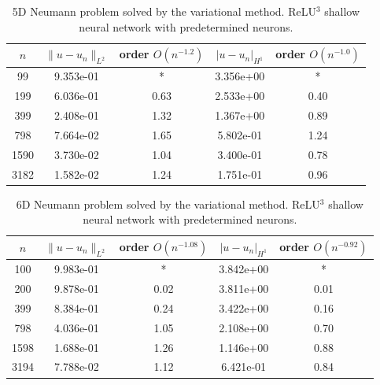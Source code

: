 \documentclass{article}
\theoremstyle{remark}
\begin{document}
      \begin{table}[H]
        \centering
        \begin{tabular}{c|c|c|c|c}
$n$ & 	 $\|u-u_n \|_{L^2}$ & 	 order $O(n^{-1.2})$ & $ |u-u_n |_{H^1}$ & 	 order $O(n^{-1.0})$\\ \hline \hline 
99 		 &  9.353e-01 &  		*  &  3.356e+00 &  *   \\ \hline  
199 		 &  6.036e-01 &  		 0.63  &  2.533e+00 &  0.40  \\ \hline  
399 		 &  2.408e-01 &  		 1.32  &  1.367e+00 &  0.89  \\ \hline  
798 		 &  7.664e-02 &  		 1.65  &  5.802e-01 &  1.24  \\ \hline  
1590 		 &  3.730e-02 &  		 1.04  &  3.400e-01 &  0.78  \\ \hline  
3182 		 &  1.582e-02 &  		 1.24  &  1.751e-01 &  0.96  \\ \hline 
        \end{tabular}
        \caption{5D Neumann problem solved by the variational method. ReLU$^3$ shallow neural network with predetermined neurons. }
        \label{tab:Neuman-RFM-ex1-5d}
    \end{table}
    
      \begin{table}[H]
        \centering
        \begin{tabular}{c|c|c|c|c}
$n$ & 	 $\|u-u_n \|_{L^2}$ & 	 order $O(n^{-1.08})$  & $ |u-u_n |_{H^1}$ & 	 order $O(n^{-0.92})$\\ \hline \hline 

100 		 &  9.983e-01 &  		 *  &  3.842e+00 &  *  \\ \hline  
200 		 &  9.878e-01 &  		 0.02  &  3.811e+00 &  0.01  \\ \hline  

399 		 &  8.384e-01 &  		 0.24  &  3.422e+00 &  0.16  \\ \hline  

798 		 &  4.036e-01 &  		 1.05  &  2.108e+00 &  0.70  \\ \hline  

1598 		 &  1.688e-01 &  		 1.26  &  1.146e+00 &  0.88  \\ \hline  

3194 		 &  7.788e-02 &  		 1.12  &  6.421e-01 &  0.84  \\ \hline  
        \end{tabular}
        \caption{6D Neumann problem solved by the variational method. ReLU$^3$ shallow neural network with predetermined neurons. }
        \label{tab:Neuman-RFM-ex1-6d}
    \end{table}
\end{document}
